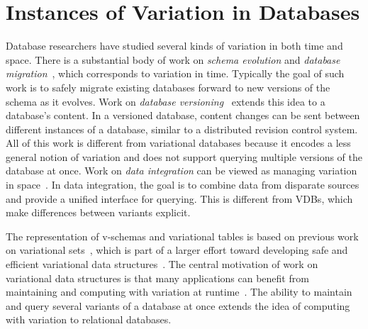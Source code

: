 \section{Instances of Variation in Databases}
\label{sec:vardbinstance}

Database researchers have studied several kinds of variation in
both time and space. There is a substantial body of work on \emph{schema
evolution} and \emph{database
migration}~\cite{Prism08Curino,prima08Moon,schEvolUnifyApp,schEvolIssues03Ram},
which corresponds to variation in time. Typically the goal of such work is to
safely migrate existing databases forward to new versions of the schema as it
evolves. 
%
Work on \emph{database versioning}~\cite{datasetVersioning,dbVersioning}
extends this idea to a database's content. In a versioned database, 
content changes can be sent between different instances of a database, similar
to a distributed revision control system.
%
All of this work is different from variational databases because it encodes a
less general notion of variation and does not support querying multiple
versions of the database at once.
%
Work on \emph{data integration} can be viewed as managing variation in
space~\cite{dataIntegBook}. In data integration, the goal is to combine data
from disparate sources and provide a unified interface for querying.
This is different from VDBs, which make differences between variants
explicit. %

The representation of v-schemas and variational tables is based on previous
work on variational sets~\cite{EWC13fosd}, which is part of a larger effort
toward developing safe and efficient variational data
structures~\cite{Walk14onward,MMWWK17vamos}. The central motivation of work on
variational data structures is that many applications can benefit from
maintaining and computing with variation at
runtime~\cite{EW11gttse,CEW16ecoop}. The ability to maintain and query several
variants of a database at once extends the idea of computing with variation to
relational databases.

